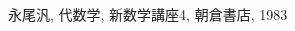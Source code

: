 \documentclass[12pt,twoside]{jarticle}
\begin{document}




\begin{thebibliography}{AB}

永尾汎, 代数学, 新数学講座4, 朝倉書店, 1983

\end{thebibliography}

\end{document}
